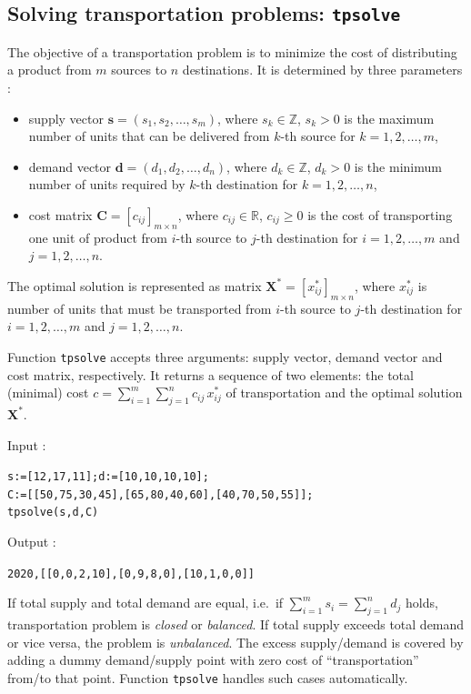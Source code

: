 \documentclass[a4paper,11pt]{book}
\begin{document}
\subsection{Solving transportation problems: {\tt tpsolve}}
The objective of a transportation problem is to minimize the cost of distributing a product from $ m $ sources to $ n $ destinations. It is determined by three parameters :
\begin{itemize}
\item supply vector $ \mathbf{s}=(s_1,s_2,\dots,s_m) $, where $ s_k\in\mathbb{Z} $, $ s_k>0 $ is the maximum number of units that can be delivered from $ k $-th source for $ k=1,2,\dots,m $,
\item demand vector $ \mathbf{d}=(d_1,d_2,\dots,d_n) $, where $ d_k\in\mathbb{Z} $, $ d_k>0 $ is the minimum number of units required by $ k $-th destination for $ k=1,2,\dots,n $,
\item cost matrix $ \mathbf{C}=[c_{ij}]_{m\times n} $, where $ c_{ij}\in\mathbb{R} $, $ c_{ij}\geq 0 $ is the cost of transporting one unit of product from $ i $-th source to $ j $-th destination for $ i=1,2,\dots,m $ and $ j=1,2,\dots,n $.
\end{itemize}
The optimal solution is represented as matrix $ \mathbf{X}^*=[x^*_{ij}]_{m\times n} $, where $ x^*_{ij} $ is number of units that must be transported from $ i $-th source to $ j $-th destination for $ i=1,2,\dots,m $ and $ j=1,2,\dots,n $.

Function {\tt tpsolve} accepts three arguments: supply vector, demand vector and cost matrix, respectively. It returns a sequence of two elements: the total (minimal) cost $ c=\sum_{i=1}^m\sum_{j=1}^nc_{ij}\,x^*_{ij} $ of transportation and the optimal solution $ \mathbf{X}^* $.

\noindent Input :
\begin{center}
{\tt s:=[12,17,11];d:=[10,10,10,10];}\\
{\tt C:=[[50,75,30,45],[65,80,40,60],[40,70,50,55]];}\\
{\tt tpsolve(s,d,C)}
\end{center}
Output :
\begin{center}
{\tt 2020,[[0,0,2,10],[0,9,8,0],[10,1,0,0]]}
\end{center}

If total supply and total demand are equal, i.e.~if $ \sum_{i=1}^ms_i=\sum_{j=1}^nd_j $ holds, transportation problem is \emph{closed} or \emph{balanced}. If total supply exceeds total demand or vice versa, the problem is \emph{unbalanced}. The excess supply/demand is covered by adding a dummy demand/supply point with zero cost of ``transportation'' from/to that point. Function {\tt tpsolve} handles such cases automatically.
\end{document}
